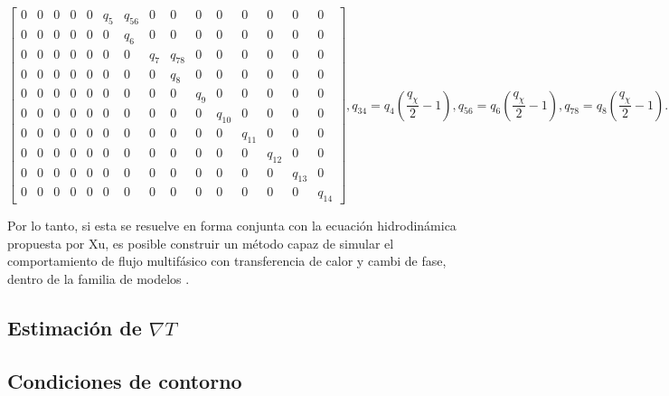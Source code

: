 \begin{subequations}
\begin{equation}
\begin{bmatrix}
		0 & 0 & 0 & 0 & 0 & q_5 & q_{56} & 0 & 0 & 0 & 0 & 0 & 0 & 0 & 0 \\
		0 & 0 & 0 & 0 & 0 & 0 & q_6 & 0 & 0 & 0 & 0 & 0 & 0 & 0 & 0 \\
		0 & 0 & 0 & 0 & 0 & 0 & 0 & q_7 & q_{78} & 0 & 0 & 0 & 0 & 0 & 0 \\
		0 & 0 & 0 & 0 & 0 & 0 & 0 & 0 & q_8 & 0 & 0 & 0 & 0 & 0 & 0 \\
		0 & 0 & 0 & 0 & 0 & 0 & 0 & 0 & 0 & q_{9} & 0 & 0 & 0 & 0 & 0 \\
		0 & 0 & 0 & 0 & 0 & 0 & 0 & 0 & 0 & 0 & q_{10} & 0 & 0 & 0 & 0 \\
		0 & 0 & 0 & 0 & 0 & 0 & 0 & 0 & 0 & 0 & 0 & q_{11} & 0 & 0 & 0 \\
		0 & 0 & 0 & 0 & 0 & 0 & 0 & 0 & 0 & 0 & 0 & 0 & q_{12} & 0 & 0 \\
		0 & 0 & 0 & 0 & 0 & 0 & 0 & 0 & 0 & 0 & 0 & 0 & 0 & q_{13} & 0 \\
		0 & 0 & 0 & 0 & 0 & 0 & 0 & 0 & 0 & 0 & 0 & 0 & 0 & 0 & q_{14}
		\end{bmatrix},	
	\end{equation}
	\begin{equation}
		q_{34} = q_4 \left( \dfrac{q_{\chi}}{2} - 1 \right),
	\end{equation}
	\begin{equation}
		q_{56} = q_6 \left( \dfrac{q_{\chi}}{2} - 1 \right),
	\end{equation}
	\begin{equation}
		q_{78} = q_8 \left( \dfrac{q_{\chi}}{2} - 1 \right).
	\end{equation}	
	\label{eq:modelo_3d_full}
\end{subequations}

Por lo tanto, si esta \lbe{} se resuelve en forma conjunta con la ecuaci\'on hidrodin\'amica propuesta por Xu, es posible construir un m\'etodo capaz de simular el comportamiento de flujo multif\'asico con transferencia de calor y cambi de fase, dentro de la familia de modelos \pp{}.

\subsection{Estimaci\'on de $\nabla T$}

\subsection{Condiciones de contorno}


